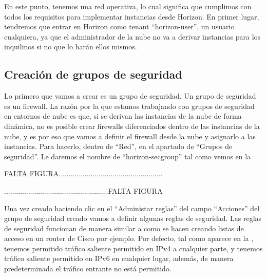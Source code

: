 En este punto, tenemos una red operativa, lo cual significa que cumplimos con todos los requisitos para implementar instancias desde Horizon. En primer lugar, tendremos que entrar en Horizon como tenant “horizon-user”, un usuario cualquiera, ya que el administrador de la nube no va a derivar instancias para los inquilinos si no que lo harán ellos mismos.

\subsection{Creación de grupos de seguridad}
Lo primero que vamos a crear es un grupo de seguridad. Un grupo de seguridad es un firewall. La razón por la que estamos trabajando con grupos de seguridad en entornos de nube es que, si se derivan las instancias de la nube de forma dinámica, no es posible crear firewalls diferenciados dentro de las instancias de la nube, y es por eso que vamos a definir el firewall desde la nube y asignarlo a las instancias. Para hacerlo, dentro de “Red”, en el apartado de “Grupos de seguridad”. Le daremos el nombre de “horizon-secgroup” tal como vemos en la %

\begin{tcolorbox}[colback=green!5!white,colframe=green!75!black]
FALTA FIGURA....................................................

....................................................FALTA FIGURA
\end{tcolorbox}

Una vez creado haciendo clic en el “Administar reglas” del campo “Acciones” del grupo de seguridad creado vamos a definir algunas reglas de seguridad. Las reglas de seguridad funcionan de manera similar a como se hacen creando listas de acceso en un router de Cisco por ejemplo. Por defecto, tal como aparece en la %
, tenemos permitido tráfico saliente permitido en IPv4 a cualquier parte, y tenemos tráfico saliente permitido en IPv6 en cualquier lugar, además, de manera predeterminada el tráfico entrante no está permitido.

